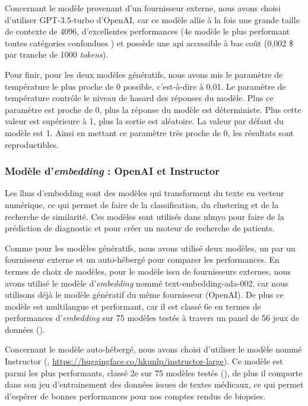 Concernant le modèle provenant d'un fournisseur externe, nous avons choisi d'utiliser GPT-3.5-turbo d'OpenAI, car ce modèle allie à la fois une grande taille de contexte de 4096, d'excellentes performances (4e modèle le plus performant toutes catégories confondues \cite{lianmin_zheng_chatbot_2023}) et possède une \gls{api} accessible à bas coût (0,002 \$ par tranche de 1000 \textit{tokens}).

Pour finir, pour les deux modèles génératifs, nous avons mis le paramètre de température le plus proche de 0 possible, c'est-à-dire à 0,01. Le paramètre de température contrôle le niveau de hasard des réponses du modèle. Plus ce paramètre est proche de 0, plus la réponse du modèle est déterministe. Plus cette valeur est supérieure à 1, plus la sortie est aléatoire. La valeur par défaut du modèle est 1. Ainsi en mettant ce paramètre très proche de 0, les résultats sont reproductibles. 

\subsubsection{Modèle d'\textit{embedding} : OpenAI et Instructor}
Les \gls{llms} d'embedding sont des modèles qui transforment du texte en vecteur numérique, ce qui permet de faire de la classification, du clustering et de la recherche de similarité. Ces modèles sont utilisés dans \gls{nlmyo} pour faire de la prédiction de diagnostic et pour créer un moteur de recherche de patients.

Comme pour les modèles génératifs, nous avons utilisé deux modèles, un par un fournisseur externe et un auto-hébergé pour comparer les performances. En termes de choix de modèles, pour le modèle issu de fournisseurs externes, nous avons utilisé le modèle d'\textit{embedding} nommé text-embedding-ada-002, car nous utilisons déjà le modèle génératif du même fournisseur (OpenAI). De plus ce modèle est multilangue et performant, car il est classé 6e en termes de performances d'\textit{embedding} sur 75 modèles testés à travers un panel de 56 jeux de données (\cite{muennighoff_mteb_2022}).

Concernant le modèle auto-hébergé, nous avons choisi d'utiliser le modèle nommé Instructor (\cite{su_one_2023}, \url{https://huggingface.co/hkunlp/instructor-large}). Ce modèle est parmi les plus performants, classé 2e sur 75 modèles testés (\cite{muennighoff_mteb_2022}), de plus il comporte dans son jeu d'entrainement des données issues de textes médicaux, ce qui permet d'espérer de bonnes performances pour nos comptes rendus de biopsies. 


